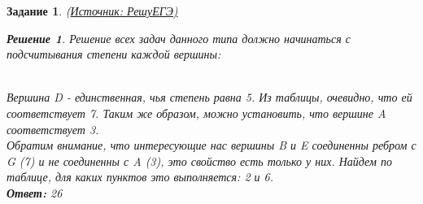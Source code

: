 \documentclass[12pt]{article}
\theoremstyle{problem_style}
\newtheorem{problem}{Задание}[subsection]
\newtheorem{solution}{Решение}[subsection]
\begin{document}
\begin{problem}
(\href{https://inf-ege.sdamgia.ru/}{Источник: РешуЕГЭ)} %
\begin{solution}
Решение всех задач данного типа должно начинаться с подсчитывания степени каждой вершины:
\begin{figure}[h]
    \centering
\end{figure}\\
Вершина D - единственная, чья степень равна 5. Из таблицы, очевидно, что ей соответствует 7. Таким же образом, можно установить, что вершине A соответствует 3.\\
Обратим внимание, что интересующие нас вершины B и E соединенны ребром с G (7) и не соединенны с A (3), это свойство есть только у них. Найдем по таблице, для каких пунктов это выполняется: 2 и 6.\\
\textbf{Ответ:} 26
\end{solution}
\break
\end{problem}
\end{document}
